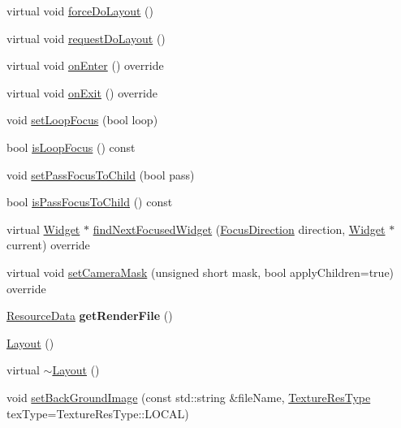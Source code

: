 \begin{DoxyCompactItemize}
\item 
virtual void \hyperlink{classui_1_1Layout_a280952253418e0951ecdff43172a3c68}{force\+Do\+Layout} ()
\item 
virtual void \hyperlink{classui_1_1Layout_a972bfe6c80741c99becff44a3f991558}{request\+Do\+Layout} ()
\item 
virtual void \hyperlink{classui_1_1Layout_a13b57bb4cec0d694e8053c393499d8b2}{on\+Enter} () override
\item 
virtual void \hyperlink{classui_1_1Layout_a6444f3e3f124723e75f80b3d36408e34}{on\+Exit} () override
\item 
void \hyperlink{classui_1_1Layout_aff48ab68a81a6c065c3e7aaed4eafa29}{set\+Loop\+Focus} (bool loop)
\item 
bool \hyperlink{classui_1_1Layout_a68b58a782140967c44016b1060c4c111}{is\+Loop\+Focus} () const
\item 
void \hyperlink{classui_1_1Layout_a5188ac4854ffba6818e19bfd0325828f}{set\+Pass\+Focus\+To\+Child} (bool pass)
\item 
bool \hyperlink{classui_1_1Layout_af9a1038bbc2d4429cd4d37d5b44b83ce}{is\+Pass\+Focus\+To\+Child} () const
\item 
virtual \hyperlink{classui_1_1Widget}{Widget} $\ast$ \hyperlink{classui_1_1Layout_a49f3db931bff292e279ddd65dcd3fe6f}{find\+Next\+Focused\+Widget} (\hyperlink{classui_1_1Widget_a8ae8e8fc793a04a87584205cd1e8a8a5}{Focus\+Direction} direction, \hyperlink{classui_1_1Widget}{Widget} $\ast$current) override
\item 
virtual void \hyperlink{classui_1_1Layout_a38e44717b8af16b5b5c1f299081ae854}{set\+Camera\+Mask} (unsigned short mask, bool apply\+Children=true) override
\item 
\mbox{\label{classui_1_1Layout_ac08d4da75c1844c005b542cdf495fd13}} 
\hyperlink{structResourceData}{Resource\+Data} {\bfseries get\+Render\+File} ()
\item 
\hyperlink{classui_1_1Layout_a66721b8d2153b0d8752a03f02787eab2}{Layout} ()
\item 
virtual \hyperlink{classui_1_1Layout_a82d4cf609145d7ee5858ec7eb68acfbb}{$\sim$\+Layout} ()
\item 
void \hyperlink{classui_1_1Layout_aa33fbde02d2a60b7cb09b8fe3868b885}{set\+Back\+Ground\+Image} (const std\+::string \&file\+Name, \hyperlink{classui_1_1Widget_a040a65ec5ad3b11119b7e16b98bd9af0}{Texture\+Res\+Type} tex\+Type=Texture\+Res\+Type\+::\+L\+O\+C\+AL)
\item 

\end{DoxyCompactItemize}

